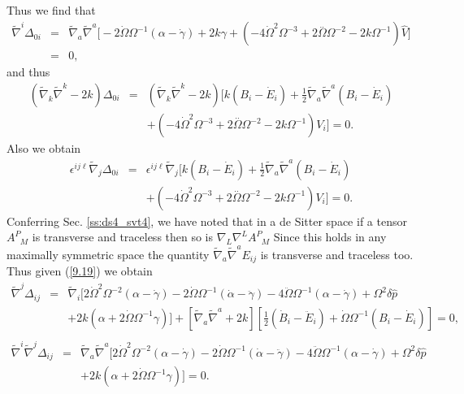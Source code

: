 %
Thus we find that 
%
\begin{eqnarray}
\tilde\nabla^i \Delta_{0i} &=& 
\tilde\nabla_a\tilde\nabla^a\big[ -2 \dot{\Omega} \Omega^{-1} (\alpha - \dot\gamma) + 2 k \gamma 
+(-4 \dot{\Omega}^2 \Omega^{-3}  + 2 \overset{..}{\Omega} \Omega^{-2}  - 2 k \Omega^{-1}) \hat{V}\big]
\nonumber\\
&=&0,
\label{9.22}
\end{eqnarray}
%
and thus
%
\begin{eqnarray}
(\tilde{\nabla}_k\tilde\nabla^k -2k)\Delta_{0i} &=& (\tilde{\nabla}_k\tilde\nabla^k-2k)\bigg[k(B_i-\dot E_i)+ \tfrac{1}{2} \tilde{\nabla}_{a}\tilde{\nabla}^{a}(B_{i} - \dot{E}_{i})
\nonumber\\
&&
+ (-4 \dot{\Omega}^2 \Omega^{-3} + 2 \overset{..}{\Omega} \Omega^{-2} - 2 k \Omega^{-1})V_{i}\bigg]
=0.~~~~~~
\label{9.23}
\end{eqnarray}
%
Also we obtain
%
\begin{eqnarray}
\epsilon^{ij\ell}\tilde{\nabla}_j\Delta_{0i}&=&\epsilon^{ij\ell}\tilde{\nabla}_j\bigg[k(B_i-\dot E_i)+ \tfrac{1}{2} \tilde{\nabla}_{a}\tilde{\nabla}^{a}(B_{i} - \dot{E}_{i})
\nonumber\\
&&
+ (-4 \dot{\Omega}^2 \Omega^{-3} + 2 \overset{..}{\Omega} \Omega^{-2} - 2 k \Omega^{-1})V_{i}\bigg]=0.
\label{9.24}
\end{eqnarray}
%
Conferring Sec. \ref{ss:ds4_svt4}, we have noted that in a de Sitter space if a tensor $A^{P}_{\phantom{P}M}$ is transverse and traceless then so is $\nabla_L\nabla^LA^{P}_{\phantom{P}M}$ Since this holds in any maximally symmetric space the quantity  $\tilde{\nabla}_a\tilde{\nabla}^aE_{ij}$ is transverse and traceless too. Thus given (\ref{9.19}) we  obtain
%
\begin{eqnarray}
\tilde\nabla^j\Delta_{ij}&=& \tilde{\nabla}_{i}[ 2 \dot{\Omega}^2 \Omega^{-2}(\alpha-\dot\gamma)
-2  \dot{\Omega} \Omega^{-1}(\dot\alpha -\ddot\gamma)-4\ddot\Omega\Omega^{-1}(\alpha-\dot\gamma)+ \Omega^2 \delta \hat{p}
\nonumber\\
&&+ 2 k(\alpha + 2 \dot{\Omega}  \Omega^{-1} \gamma)]
+[ \tilde{\nabla}_{a}\tilde{\nabla}^{a}+2k][\tfrac{1}{2}(\dot{B}_i-\ddot{E}_i)+\dot{\Omega}\Omega^{-1}(B_i-\dot{E}_i)]=0,
\nonumber\\
\label{9.25}
\end{eqnarray}
%
%
\begin{eqnarray}
\tilde\nabla^i\tilde\nabla^j\Delta_{ij}&=& \tilde{\nabla}_{a}\tilde{\nabla}^{a}[2 \dot{\Omega}^2 \Omega^{-2}(\alpha-\dot\gamma)
-2  \dot{\Omega} \Omega^{-1}(\dot\alpha -\ddot\gamma)-4\ddot\Omega\Omega^{-1}(\alpha-\dot\gamma)+ \Omega^2 \delta \hat{p}
\nonumber \\ 
&& + 2 k(\alpha + 2 \dot{\Omega}  \Omega^{-1} \gamma)]=0.
\label{9.26}
\end{eqnarray}
